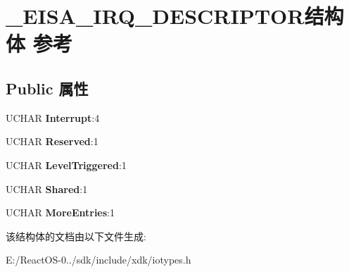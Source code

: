 \hypertarget{struct___e_i_s_a___i_r_q___d_e_s_c_r_i_p_t_o_r}{}\section{\+\_\+\+E\+I\+S\+A\+\_\+\+I\+R\+Q\+\_\+\+D\+E\+S\+C\+R\+I\+P\+T\+O\+R结构体 参考}
\label{struct___e_i_s_a___i_r_q___d_e_s_c_r_i_p_t_o_r}
\subsection*{Public 属性}
\begin{DoxyCompactItemize}
\item 
\mbox{\label{struct___e_i_s_a___i_r_q___d_e_s_c_r_i_p_t_o_r_a7dfc3a7686246ad9ed6d52d187404a7f}} 
U\+C\+H\+AR {\bfseries Interrupt}\+:4
\item 
\mbox{\label{struct___e_i_s_a___i_r_q___d_e_s_c_r_i_p_t_o_r_a1e66999b4058d410592a80ddb0f3ce82}} 
U\+C\+H\+AR {\bfseries Reserved}\+:1
\item 
\mbox{\label{struct___e_i_s_a___i_r_q___d_e_s_c_r_i_p_t_o_r_ac52c828738249b41dfa8b068f3e80601}} 
U\+C\+H\+AR {\bfseries Level\+Triggered}\+:1
\item 
\mbox{\label{struct___e_i_s_a___i_r_q___d_e_s_c_r_i_p_t_o_r_ad27bfee6a83e5e5b085b097e64503682}} 
U\+C\+H\+AR {\bfseries Shared}\+:1
\item 
\mbox{\label{struct___e_i_s_a___i_r_q___d_e_s_c_r_i_p_t_o_r_a6f5fa8039ee3ada4d1244d327c99b4a6}} 
U\+C\+H\+AR {\bfseries More\+Entries}\+:1
\end{DoxyCompactItemize}


该结构体的文档由以下文件生成\+:\begin{DoxyCompactItemize}
\item 
E\+:/\+React\+O\+S-\/0../sdk/include/xdk/iotypes.\+h\end{DoxyCompactItemize}
